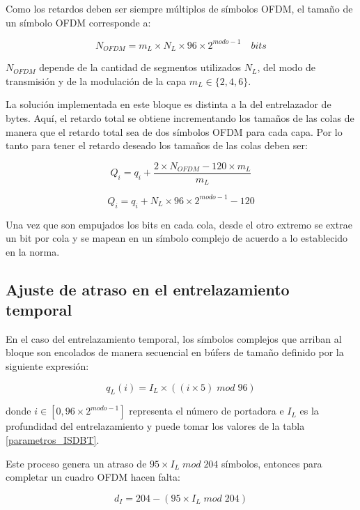 \documentclass[journal,comsoc]{IEEEtran}
\begin{document}
Como los retardos deben ser siempre múltiplos de símbolos OFDM, el tamaño de un símbolo OFDM corresponde a:

\begin{equation}
N_{OFDM} = m_L \times N_L \times 96 \times 2^{modo - 1} \quad bits
\end{equation}

$N_{OFDM}$ depende de la cantidad de segmentos utilizados $N_L$, del modo de transmisión y de la modulación de la capa $m_L \in \{2,4,6\}$.

La solución implementada en este bloque es distinta a la del entrelazador de bytes. Aquí, el retardo total se obtiene incrementando los tamaños de las colas de manera que el retardo total sea de dos símbolos OFDM para cada capa. Por lo tanto para tener el retardo deseado los tamaños de las colas deben ser:

\begin{equation}
Q_i = q_i + \dfrac{2 \times N_{OFDM} -120 \times m_L}{m_L}
\end{equation}


\begin{equation}
Q_i = q_i +  N_L \times 96 \times 2^{modo - 1} - 120
\end{equation}

Una vez que son empujados los bits en cada cola, desde el otro extremo se extrae un bit por cola y se mapean en un símbolo complejo de acuerdo a lo establecido en la norma.

\subsection{Ajuste de atraso en el entrelazamiento temporal}
En el caso del entrelazamiento temporal, los símbolos complejos que arriban al bloque son encolados de manera secuencial en búfers de tamaño definido por la siguiente expresión:

\begin{equation}
q_L(i) = I_L \times ((i \times 5) \; mod \; 96)
\end{equation}

\noindent donde $i \in [0, 96 \times 2^{modo-1}]$ representa el número de portadora e $I_L$ es la profundidad del entrelazamiento y puede tomar los valores de la tabla \ref{parametros_ISDBT}.

Este proceso genera un atraso de $95 \times I_L \; mod \; 204$ símbolos, entonces para completar un cuadro OFDM hacen falta:

\begin{equation}
d_I = 204 - (95 \times I_L \; mod \; 204) 
\end{equation}
\end{document}
